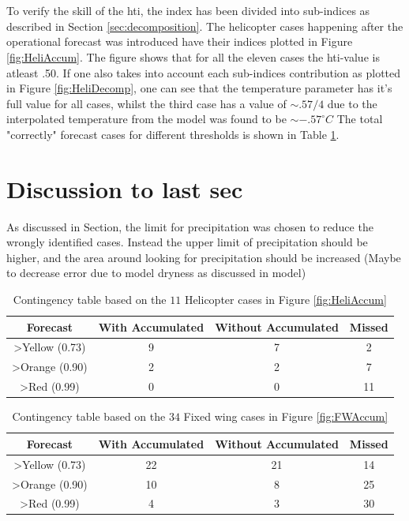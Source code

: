 \section{}
To verify the skill of the \acrshort{hti}, the index has been divided into sub-indices as described in Section \ref{sec:decomposition}. The helicopter cases happening after the operational forecast was introduced have their indices plotted in Figure \ref{fig:HeliAccum}. The figure shows that for all the eleven cases the \acrshort{hti}-value is atleast .50. If one also takes into account each sub-indices contribution as plotted in Figure \ref{fig:HeliDecomp}, one can see that the temperature parameter has it's full value for all cases, whilst the third case has a value of  $\sim .57/4$ due to the interpolated temperature from the model was found to be  $\sim -.57 ^{\circ}C$
The total "correctly" forecast cases for different thresholds is shown in Table \ref{tab:HeliCont}. 

\section{Discussion to last sec}
As discussed in Section, the limit for precipitation was chosen to reduce the wrongly identified cases. Instead the upper limit of precipitation should be higher, and the area around looking for precipitation should be increased (Maybe to decrease error due to model dryness as discussed in model)


\begin{table}[H] 
    \centering
    \begin{tabular}{c|c|c|c}
        Forecast & With Accumulated & Without Accumulated & Missed \\ \hline
        >Yellow (0.73) & 9 & 7 & 2\\
        >Orange (0.90) & 2 & 2 & 7\\ 
        >Red (0.99) & 0 & 0 & 11\\
    \end{tabular}
    \caption{Contingency table based on the $11$ Helicopter cases in Figure \ref{fig:HeliAccum}}
    \label{tab:HeliCont}
\end{table}

\begin{table}[H]
    \centering
    \begin{tabular}{c|c|c|c}
        Forecast & With Accumulated & Without Accumulated & Missed \\ \hline
        >Yellow (0.73) & 22 & 21 & 14\\
        >Orange (0.90) & 10& 8& 25\\ 
        >Red (0.99) & 4& 3& 30\\
    \end{tabular}
    \caption{Contingency table based on the $34$ Fixed wing cases in Figure \ref{fig:FWAccum}}
    \label{tab:FWCont}
\end{table}


